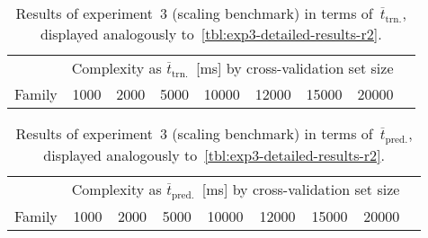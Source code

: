 \begin{table}[h]
	\centering
	{\footnotesize
		\begin{tabular}{lrrrrrrrr}
		\toprule
		{} & \multicolumn{7}{c}{Complexity as $\overline{t}_{\text{trn.}}$~[\si{\milli\second}] by cross-validation set size}\\
		\cmidrule(lr){2-8}
		Family
						& \num{1000}
						& \num{2000}
						& \num{5000}
						& \num{10000}
						& \num{12000}
						& \num{15000}
						& \num{20000}\\
		\midrule
		
		\bottomrule
		\end{tabular}
	}
	\caption{Results of experiment~3 (scaling benchmark) in ter\si{\milli\second} of~$\overline{t}_{\text{trn.}}$,
	displayed analogously to~\cref{tbl:exp3-detailed-results-r2}.}
	\label{tbl:exp3-detailed-results-t-train}
\end{table}


\begin{table}[h]
	\centering
	{\footnotesize
		\begin{tabular}{lrrrrrrrr}
		\toprule
		{} & \multicolumn{7}{c}{Complexity as $\overline{t}_{\text{pred.}}$~[\si{\milli\second}] by cross-validation set size}\\
		\cmidrule(lr){2-8}
		Family
						& \num{1000}
						& \num{2000}
						& \num{5000}
						& \num{10000}
						& \num{12000}
						& \num{15000}
						& \num{20000}\\
		\midrule
		
		\bottomrule
		\end{tabular}
	}
	\caption{Results of experiment~3 (scaling benchmark) in ter\si{\milli\second} of~$\overline{t}_{\text{pred.}}$,
	displayed analogously to~\cref{tbl:exp3-detailed-results-r2}.}
	\label{tbl:exp3-detailed-results-t-pred}
\end{table}


